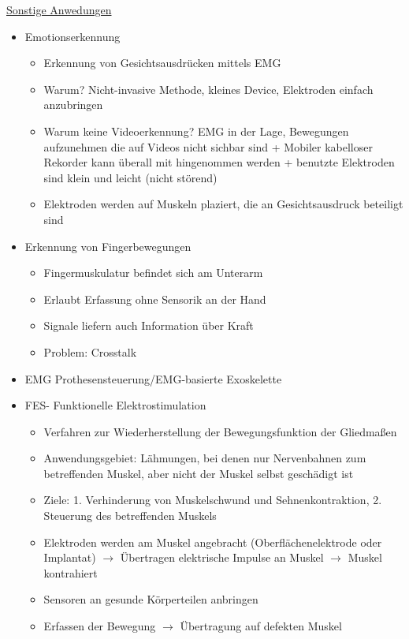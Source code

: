 \documentclass[a4paper,10pt,oneside]{article}
\begin{document}
\underline{Sonstige Anwedungen} \\
	\begin{itemize}
		\item Emotionserkennung
			\begin{itemize}
				\item Erkennung von Gesichtsausdrücken mittels EMG
				\item Warum? Nicht-invasive Methode, kleines Device, Elektroden einfach anzubringen
				\item Warum keine Videoerkennung? EMG in der Lage, Bewegungen aufzunehmen die auf Videos nicht sichbar sind + Mobiler kabelloser Rekorder kann überall mit hingenommen werden + benutzte Elektroden sind klein und leicht (nicht störend)
				\item Elektroden werden auf Muskeln plaziert, die an Gesichtsausdruck beteiligt sind
			\end{itemize}
		\item Erkennung von Fingerbewegungen
			\begin{itemize}
				\item Fingermuskulatur befindet sich am Unterarm
				\item Erlaubt Erfassung ohne Sensorik an der Hand
				\item Signale liefern auch Information über Kraft
				\item Problem: Crosstalk
			\end{itemize}
		\item EMG Prothesensteuerung/EMG-basierte Exoskelette
		\item FES- Funktionelle Elektrostimulation
			\begin{itemize}
				\item Verfahren zur Wiederherstellung der Bewegungsfunktion der Gliedmaßen
				\item Anwendungsgebiet: Lähmungen, bei denen nur Nervenbahnen zum betreffenden Muskel, aber nicht der Muskel selbst geschädigt ist
				\item Ziele: 1. Verhinderung von Muskelschwund und Sehnenkontraktion, 2. Steuerung des betreffenden Muskels
				\item Elektroden werden am Muskel angebracht (Oberflächenelektrode oder Implantat) $\rightarrow$ Übertragen elektrische Impulse an Muskel $\rightarrow$ Muskel kontrahiert
				\item Sensoren an gesunde Körperteilen anbringen 
				\item Erfassen der Bewegung $\rightarrow$ Übertragung auf defekten Muskel
			\end{itemize}
	\end{itemize}
 		
\end{document}
